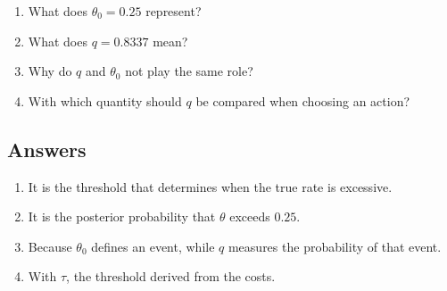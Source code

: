 \documentclass[11pt,letter]{article}
\begin{document}
\begin{enumerate}
  \item What does $\theta_0=0.25$ represent?
  \item What does $q=0.8337$ mean?
  \item Why do $q$ and $\theta_0$ not play the same role?
  \item With which quantity should $q$ be compared when choosing an action?
\end{enumerate}

\subsection*{Answers}

\begin{enumerate}
  \item It is the threshold that determines when the true rate is excessive.
  \item It is the posterior probability that $\theta$ exceeds $0.25$.
  \item Because $\theta_0$ defines an event, while $q$ measures the probability
        of that event.
  \item With $\tau$, the threshold derived from the costs.
\end{enumerate}
\end{document}
